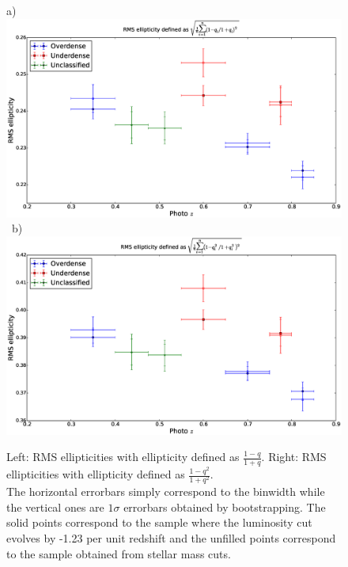 \documentclass[twocolumn,useAMS,usenatbib]{mn2e}
\begin{document}
\begin{figure}
 \centering
 a) \includegraphics[width=0.9\columnwidth]{rms_ellip1_Bbandevolution_masscut.eps} \
 b) \includegraphics[width=0.9\columnwidth]{rms_ellip2_Bbandevolution_masscut.eps} \\
 \caption{Left: RMS ellipticities with ellipticity defined as $\frac{1-q}{1+q}$. \; 
          Right: RMS ellipticities with ellipticity defined as $\frac{1-q^2}{1+q^2}$.\\ The horizontal errorbars simply correspond to the binwidth while the vertical ones
          are $1\sigma$ errorbars obtained by bootstrapping. The solid points correspond to the sample where the luminosity cut evolves by -1.23 per unit redshift and the unfilled
          points correspond to the sample obtained from stellar mass cuts.}
 \label{fig:rms_ellip}
\end{figure}
\end{document}
